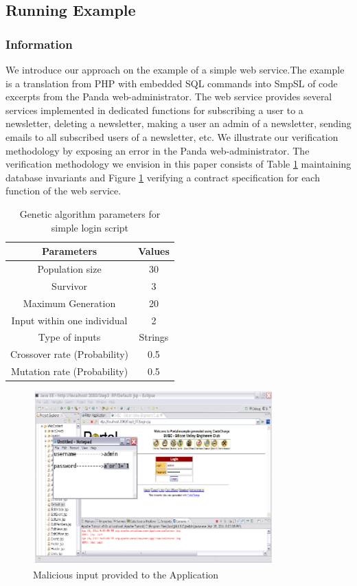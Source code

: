 \documentclass[12pt]{acmart}
\begin{document}
\subsection{Running Example}

\subsubsection{Information}

We introduce our approach on the example of a simple web service.The example is a translation from PHP with embedded SQL commands into SmpSL of code excerpts from the Panda web-administrator. The web service provides several services implemented in dedicated functions for subscribing a user to a newsletter, deleting a newsletter, making a user an admin of a newsletter, sending emails to all subscribed users of a newsletter, etc. We illustrate our verification methodology by exposing an error in the Panda web-administrator. The verification methodology we envision in this paper consists of Table \ref{tab1} maintaining database invariants and Figure \ref{pic1} verifying a contract specification for each function of the web service.

\begin{table}[H]
\caption{Genetic algorithm parameters for simple login script}
    \begin{tabular}{|c|c|}
        \hline
        Parameters  & Values \\
        \hline
        Population size  & 30 \\
        \hline
        Survivor & 3 \\
        \hline
        Maximum Generation & 20 \\
        \hline
        Input within one individual & 2 \\
        \hline
        Type of inputs & Strings \\
        \hline
        Crossover rate (Probability) & 0.5 \\
        \hline
        Mutation rate (Probability) & 0.5 \\
        \hline
    \end{tabular}
\label{tab1}
\end{table}

\begin{figure}[H]
    \centering
    \includegraphics{Picture1.png}
    \caption{Malicious input provided to the Application}
    \label{pic1}
\end{figure}
\end{document}
